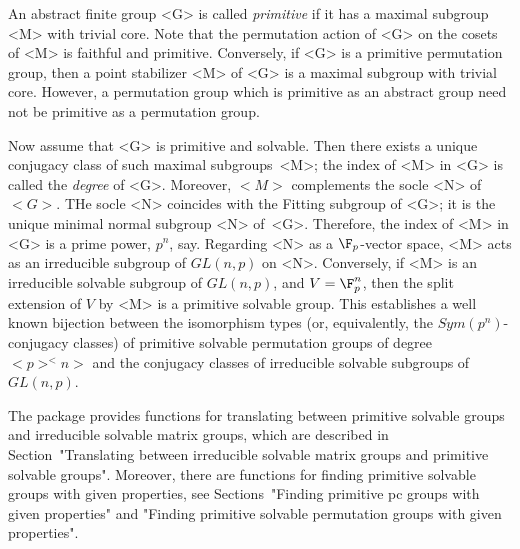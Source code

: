 


An abstract finite group <G> is called {\it primitive} if it has a maximal 
subgroup <M> with trivial core. Note that the permutation action of <G> on the 
cosets of <M> is faithful and primitive. Conversely, if <G> is a primitive 
permutation group, then a point stabilizer <M> of <G> is a maximal
subgroup with trivial core. However, a permutation group which is primitive 
as an abstract group need not be primitive as a permutation group. 

Now assume that <G> is primitive and solvable. Then there exists a unique conjugacy class of 
such maximal subgroups~<M>; the index of <M> in <G> is called the {\it degree} of <G>.
Moreover, $<M>$ 
complements the socle <N> of $<G>$. THe socle <N> coincides with the Fitting 
subgroup of <G>; it is the unique minimal normal subgroup <N> of~<G>. Therefore, 
the index of <M> in <G> is a prime power, $p^n$, say.
Regarding <N> as a $\F_p$-vector space, <M> acts as an irreducible subgroup of $GL(n,p)$ on <N>.
Conversely, if <M> is an irreducible solvable subgroup of $GL(n,p)$, and $V = \F_p^n$, then the
split extension of $V$ by <M> is a primitive solvable group. 
This establishes a well known
bijection between the isomorphism types (or, equivalently, the 
$Sym(p^n)$-conjugacy classes) of primitive solvable permutation groups of degree
$<p>^<n>$ and the conjugacy classes of irreducible solvable subgroups of $GL(n, p)$.

The {\IRREDSOL} package provides functions for translating between primitive solvable 
groups and irreducible solvable matrix groups, which are
described in Section~"Translating between irreducible solvable matrix groups 
and primitive solvable groups". Moreover, there are functions for finding
primitive solvable groups with given properties, see Sections~"Finding primitive 
pc groups
with given properties" and "Finding primitive solvable permutation groups
with given properties".


